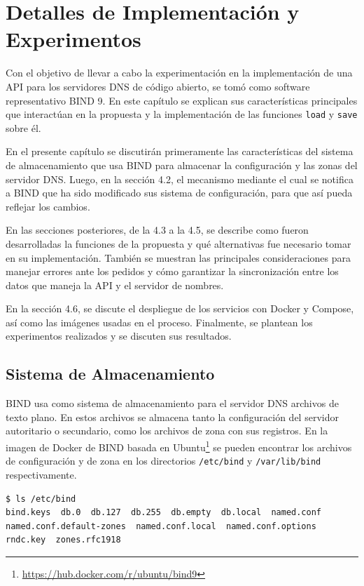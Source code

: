\chapter{Detalles de Implementación y Experimentos}\label{chapter:implementation}

Con el objetivo de llevar a cabo la experimentación en la implementación de una API para los servidores DNS de código abierto, se tomó como software representativo BIND 9. En este capítulo se explican sus características principales que interactúan en la propuesta y la implementación de las funciones \verb|load| y \verb|save| sobre él.

En el presente capítulo se discutirán primeramente las características del sistema de almacenamiento que usa BIND para almacenar la configuración y las zonas del servidor DNS. Luego, en la sección 4.2, el mecanismo mediante el cual se notifica a BIND que ha sido modificado sus sistema de configuración, para que así pueda reflejar los cambios.

En las secciones posteriores, de la 4.3 a la 4.5, se describe como fueron desarrolladas la funciones de la propuesta y qué alternativas fue necesario tomar en su implementación. También se muestran las principales consideraciones para manejar errores ante los pedidos y cómo garantizar la sincronización entre los datos que maneja la API y el servidor de nombres.

En la sección 4.6, se discute el despliegue de los servicios con Docker y Compose, así como las imágenes usadas en el proceso. Finalmente, se plantean los experimentos realizados y se discuten sus resultados.

\section{Sistema de Almacenamiento}\label{sec:bind-storage}
BIND usa como sistema de almacenamiento para el servidor DNS archivos de texto plano. En estos archivos se almacena tanto la configuración del servidor autoritario o secundario, como los archivos de zona con sus registros. En la imagen de Docker de BIND basada en Ubuntu\footnote{\url{https://hub.docker.com/r/ubuntu/bind9}} se pueden encontrar los archivos de configuración y de zona en los directorios \verb+/etc/bind+ y \verb+/var/lib/bind+ respectivamente.

\begin{lstlisting}[frame=single, numbers=none, caption=Contenido del directorio \textbf{/etc/bind}.]
$ ls /etc/bind
bind.keys  db.0  db.127  db.255  db.empty  db.local  named.conf
named.conf.default-zones  named.conf.local  named.conf.options
rndc.key  zones.rfc1918
\end{lstlisting}

